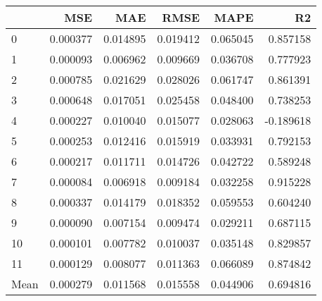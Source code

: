 \begin{tabular}{lrrrrr}
\toprule
 & MSE & MAE & RMSE & MAPE & R2 \\
\midrule
0 & 0.000377 & 0.014895 & 0.019412 & 0.065045 & 0.857158 \\
1 & 0.000093 & 0.006962 & 0.009669 & 0.036708 & 0.777923 \\
2 & 0.000785 & 0.021629 & 0.028026 & 0.061747 & 0.861391 \\
3 & 0.000648 & 0.017051 & 0.025458 & 0.048400 & 0.738253 \\
4 & 0.000227 & 0.010040 & 0.015077 & 0.028063 & -0.189618 \\
5 & 0.000253 & 0.012416 & 0.015919 & 0.033931 & 0.792153 \\
6 & 0.000217 & 0.011711 & 0.014726 & 0.042722 & 0.589248 \\
7 & 0.000084 & 0.006918 & 0.009184 & 0.032258 & 0.915228 \\
8 & 0.000337 & 0.014179 & 0.018352 & 0.059553 & 0.604240 \\
9 & 0.000090 & 0.007154 & 0.009474 & 0.029211 & 0.687115 \\
10 & 0.000101 & 0.007782 & 0.010037 & 0.035148 & 0.829857 \\
11 & 0.000129 & 0.008077 & 0.011363 & 0.066089 & 0.874842 \\
Mean & 0.000279 & 0.011568 & 0.015558 & 0.044906 & 0.694816 \\
\bottomrule
\end{tabular}
